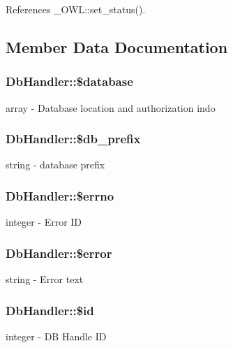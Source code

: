 References \_\-OWL::set\_\-status().



\subsection{Member Data Documentation}
\subsubsection[{\$database}]{\setlength{\rightskip}{0pt plus 5cm}DbHandler::\$database}\label{classDbHandler_afaac5248f9ee59786b48a7b51f318940}
array -\/ Database location and authorization indo 
\subsubsection[{\$db\_\-prefix}]{\setlength{\rightskip}{0pt plus 5cm}DbHandler::\$db\_\-prefix}\label{classDbHandler_a19af96598e7f72673fc5da26ad77731b}
string -\/ database prefix 
\subsubsection[{\$errno}]{\setlength{\rightskip}{0pt plus 5cm}DbHandler::\$errno}\label{classDbHandler_af6e9f493be56617cb533763bb2a0e85a}
integer -\/ Error ID 
\subsubsection[{\$error}]{\setlength{\rightskip}{0pt plus 5cm}DbHandler::\$error}\label{classDbHandler_ade79e11156abbfc180864beb5b9df377}
string -\/ Error text 
\subsubsection[{\$id}]{\setlength{\rightskip}{0pt plus 5cm}DbHandler::\$id}\label{classDbHandler_ad38e1c3312815c8ad4093957881092ff}
integer -\/ DB Handle ID 
